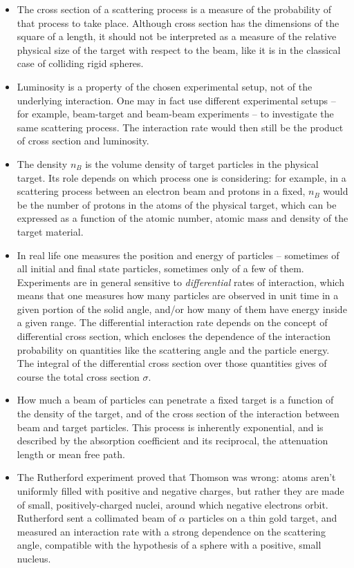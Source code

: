 \begin{itemize}
    \item The cross section of a scattering process is a measure of the probability of that process to take place. Although cross section has the dimensions of the square of a length, it should not be interpreted as a measure of the relative physical size of the target with respect to the beam, like it is in the classical case of colliding rigid spheres.
    \item Luminosity is a property of the chosen experimental setup, not of the underlying interaction. One may in fact use different experimental setups -- for example, beam-target and beam-beam experiments -- to investigate the same scattering process. The interaction rate would then still be the product of cross section and luminosity.
    \item The density $n_B$ is the volume density of target particles in the physical target. Its role depends on which process one is considering: for example, in a scattering process between an electron beam and protons in a fixed, $n_B$ would be the number of protons in the atoms of the physical target, which can be expressed as a function of the atomic number, atomic mass and density of the target material.
    \item In real life one measures the position and energy of particles -- sometimes of all initial and final state particles, sometimes only of a few of them. Experiments are in general sensitive to \emph{differential} rates of interaction, which means that one measures how many particles are observed in unit time in a given portion of the solid angle, and/or how many of them have energy inside a given range. The differential interaction rate depends on the concept of differential cross section, which encloses the dependence of the interaction probability on quantities like the scattering angle and the particle energy. The integral of the differential cross section over those quantities gives of course the total cross section $\sigma$.
    \item How much a beam of particles can penetrate a fixed target is a function of the density of the target, and of the cross section of the interaction between beam and target particles. This process is inherently exponential, and is described by the absorption coefficient and its reciprocal, the attenuation length or mean free path.
    \item The Rutherford experiment proved that Thomson was wrong: atoms aren't uniformly filled with positive and negative charges, but rather they are made of small, positively-charged nuclei, around which negative electrons orbit. Rutherford sent a collimated beam of $\alpha$ particles on a thin gold target, and measured an interaction rate with a strong dependence on the scattering angle, compatible with the hypothesis of a sphere with a positive, small nucleus.

\end{itemize}
